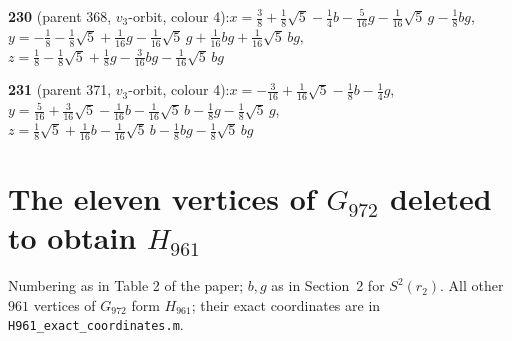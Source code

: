 \documentclass[10pt]{article}
\begin{document}
{\noindent\textbf{230} (parent 368, $v_3$-orbit, colour 4):\quad $x=\tfrac{3}{8}+\tfrac{1}{8}\sqrt5-\tfrac{1}{4}b-\tfrac{5}{16}g-\tfrac{1}{16}\sqrt5\,g-\tfrac{1}{8}bg$,\quad $y=-\tfrac{1}{8}-\tfrac{1}{8}\sqrt5+\tfrac{1}{16}g-\tfrac{1}{16}\sqrt5\,g+\tfrac{1}{16}bg+\tfrac{1}{16}\sqrt5\,bg$,\quad $z=\tfrac{1}{8}-\tfrac{1}{8}\sqrt5+\tfrac{1}{8}g-\tfrac{3}{16}bg-\tfrac{1}{16}\sqrt5\,bg$\par\smallskip
\noindent\textbf{231} (parent 371, $v_3$-orbit, colour 4):\quad $x=-\tfrac{3}{16}+\tfrac{1}{16}\sqrt5-\tfrac{1}{8}b-\tfrac{1}{4}g$,\quad $y=\tfrac{5}{16}+\tfrac{3}{16}\sqrt5-\tfrac{1}{16}b-\tfrac{1}{16}\sqrt5\,b-\tfrac{1}{8}g-\tfrac{1}{8}\sqrt5\,g$,\quad $z=\tfrac{1}{8}\sqrt5+\tfrac{1}{16}b-\tfrac{1}{16}\sqrt5\,b-\tfrac{1}{8}bg-\tfrac{1}{8}\sqrt5\,bg$\par\smallskip
}

\section{The eleven vertices of $G_{972}$ deleted to obtain $H_{961}$}\label{app:removed}
Numbering as in Table 2 of the paper; $b,g$ as in Section~2 for $S^2(r_2)$. All other $961$ vertices of
$G_{972}$ form $H_{961}$; their exact coordinates are in \texttt{H961\_exact\_coordinates.m}.
\end{document}
